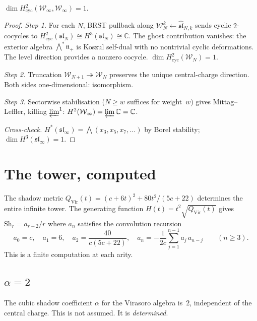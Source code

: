\documentclass[11pt]{article}
\newcommand{\cW}{\mathcal{W}}
\newcommand{\fn}{\mathfrak{n}}
\newcommand{\fsl}{\mathfrak{sl}}
\newcommand{\C}{\mathbb{C}}
\begin{document}
\begin{theorem}\label{thm:winfty-scalar}
$\dim H^2_{\mathrm{cyc}}(\cW_\infty, \cW_\infty) = 1$.
\end{theorem}

\begin{proof}
\emph{Step 1.}  For each $N$, BRST pullback along
$\cW_N^k \leftarrow \widehat{\fsl}_{N,k}$ sends cyclic
$2$-cocycles to $H^2_{\mathrm{cyc}}(\fsl_N) \cong H^3(\fsl_N)
\cong \C$.  The ghost contribution vanishes: the exterior algebra
$\bigwedge^*\fn_+$ is Koszul self-dual with no nontrivial cyclic
deformations.  The level direction provides a nonzero cocycle.
$\dim H^2_{\mathrm{cyc}}(\cW_N) = 1$.

\emph{Step 2.}  Truncation $\cW_{N+1} \twoheadrightarrow \cW_N$
preserves the unique central-charge direction.  Both sides
one-dimensional: isomorphism.

\emph{Step 3.}  Sectorwise stabilisation ($N \geq w$ suffices
for weight~$w$) gives Mittag--Leffler, killing $\varprojlim^1$:
$H^2(\cW_\infty) = \varprojlim \C = \C$.

\emph{Cross-check.}  $H^*(\fsl_\infty)
= \bigwedge(x_3, x_5, x_7, \ldots)$ by Borel stability;
$\dim H^3(\fsl_\infty) = 1$.
\end{proof}


\section{The tower, computed}
\label{sec:tower-computed}

The shadow metric
$Q_{\mathrm{Vir}}(t) = (c + 6t)^2 + 80t^2/(5c + 22)$ determines
the entire infinite tower.  The generating function
$H(t) = t^2\sqrt{Q_{\mathrm{Vir}}(t)}$ gives
$\mathrm{Sh}_r = a_{r-2}/r$ where $a_n$ satisfies the
convolution recursion
\begin{equation}\label{eq:convolution}
a_0 = c, \quad a_1 = 6, \quad
a_2 = \frac{40}{c(5c{+}22)}, \quad
a_n = -\frac{1}{2c}\sum_{j=1}^{n-1} a_j\, a_{n-j}
\qquad(n \geq 3).
\end{equation}
This is a finite computation at each arity.

\subsection*{$\alpha = 2$}

The cubic shadow coefficient $\alpha$ for the Virasoro algebra
is~$2$, independent of the central charge.  This is not assumed.
It is \emph{determined}.
\end{document}
